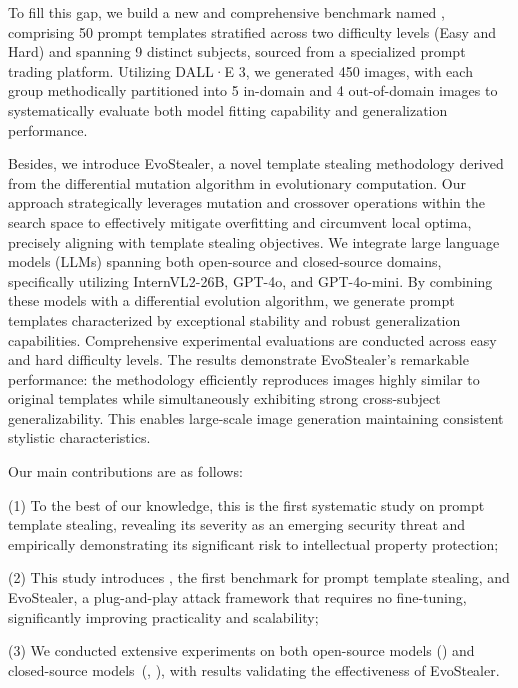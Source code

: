 To fill this gap,  we build a new and comprehensive benchmark named \data, comprising 50 prompt templates stratified across two difficulty levels (Easy and Hard) and spanning 9 distinct subjects, sourced from a specialized prompt trading platform. 
Utilizing DALL·E 3, we generated 450 images, with each group methodically partitioned into 5 in-domain and 4 out-of-domain images to systematically evaluate both model fitting capability and generalization performance. 

Besides, we introduce EvoStealer, a novel template stealing methodology derived from the differential mutation algorithm in evolutionary computation. Our approach strategically leverages mutation and crossover operations within the search space to effectively mitigate overfitting and circumvent local optima, precisely aligning with template stealing objectives. We integrate large language models (LLMs) spanning both open-source and closed-source domains, specifically utilizing InternVL2-26B, GPT-4o, and GPT-4o-mini. By combining these models with a differential evolution algorithm, we generate prompt templates characterized by exceptional stability and robust generalization capabilities. Comprehensive experimental evaluations are conducted across easy and hard difficulty levels. The results demonstrate EvoStealer's remarkable performance: the methodology efficiently reproduces images highly similar to original templates while simultaneously exhibiting strong cross-subject generalizability. This enables large-scale image generation maintaining consistent stylistic characteristics.

Our main contributions are as follows:

(1) To the best of our knowledge, this is the first systematic study on prompt template stealing, revealing its severity as an emerging security threat and empirically demonstrating its significant risk to intellectual property protection;

(2) This study introduces \data, the first benchmark for prompt template stealing, and EvoStealer, a plug-and-play attack framework that requires no fine-tuning, significantly improving practicality and scalability;

(3) We conducted extensive experiments on both open-source models (\intern) and closed-source models~(\gpta, \gpt), with results validating the effectiveness of EvoStealer.

